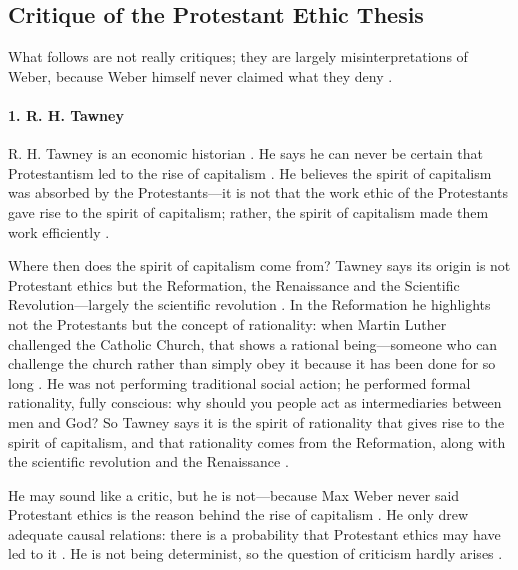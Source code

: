 \subsection{Critique of the Protestant Ethic Thesis}
What follows are not really critiques; they are largely misinterpretations of Weber, because Weber himself never claimed what they deny .

\paragraph{1. R. H. Tawney}
R. H. Tawney is an economic historian . He says he can never be certain that Protestantism led to the rise of capitalism . He believes the spirit of capitalism was absorbed by the Protestants---it is not that the work ethic of the Protestants gave rise to the spirit of capitalism; rather, the spirit of capitalism made them work efficiently .

Where then does the spirit of capitalism come from? Tawney says its origin is not Protestant ethics but the Reformation, the Renaissance and the Scientific Revolution---largely the scientific revolution .
In the Reformation he highlights not the Protestants but the concept of rationality: when Martin Luther challenged the Catholic Church, that shows a rational being---someone who can challenge the church rather than simply obey it because it has been done for so long . He was not performing traditional social action; he performed formal rationality, fully conscious: why should you people act as intermediaries between men and God? 
So Tawney says it is the spirit of rationality that gives rise to the spirit of capitalism, and that rationality comes from the Reformation, along with the scientific revolution and the Renaissance .

He may sound like a critic, but he is not---because Max Weber never said Protestant ethics is the reason behind the rise of capitalism . He only drew adequate causal relations: there is a probability that Protestant ethics may have led to it . He is not being determinist, so the question of criticism hardly arises .

